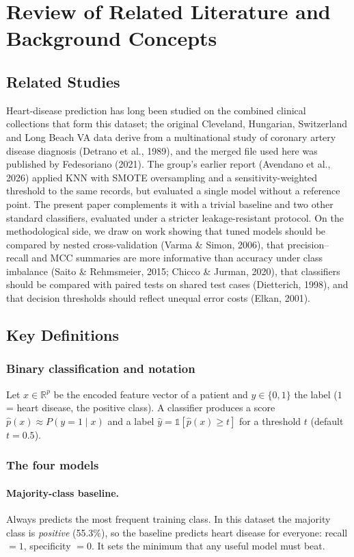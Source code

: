 \documentclass[12pt,a4paper]{article}
\begin{document}
\section{Review of Related Literature and Background Concepts}
\subsection{Related Studies}
Heart-disease prediction has long been studied on the combined clinical collections that form this dataset; the original Cleveland, Hungarian, Switzerland and Long Beach VA data derive from a multinational study of coronary artery disease diagnosis (Detrano et al., 1989), and the merged file used here was published by Fedesoriano (2021). The group's earlier report (Avendano et al., 2026) applied KNN with SMOTE oversampling and a sensitivity-weighted threshold to the same records, but evaluated a single model without a reference point. The present paper complements it with a trivial baseline and two other standard classifiers, evaluated under a stricter leakage-resistant protocol. On the methodological side, we draw on work showing that tuned models should be compared by nested cross-validation (Varma \& Simon, 2006), that precision--recall and MCC summaries are more informative than accuracy under class imbalance (Saito \& Rehmsmeier, 2015; Chicco \& Jurman, 2020), that classifiers should be compared with paired tests on shared test cases (Dietterich, 1998), and that decision thresholds should reflect unequal error costs (Elkan, 2001).

\subsection{Key Definitions}
\subsubsection{Binary classification and notation}
Let $x\in\mathbb{R}^p$ be the encoded feature vector of a patient and $y\in\{0,1\}$ the label ($1$ = heart disease, the positive class). A classifier produces a score $\hat p(x)\approx P(y=1\mid x)$ and a label $\hat y=\mathbb{1}[\hat p(x)\ge t]$ for a threshold $t$ (default $t=0.5$).

\subsubsection{The four models}
\paragraph{Majority-class baseline.} Always predicts the most frequent training class. In this dataset the majority class is \emph{positive} (55.3\%), so the baseline predicts heart disease for everyone: recall $=1$, specificity $=0$. It sets the minimum that any useful model must beat.
\end{document}
